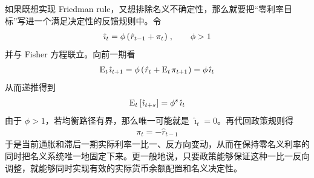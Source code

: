 \myskip
{}

如果既想实现 Friedman rule，又想排除名义不确定性，那么就要把“零利率目标”写进一个满足决定性的反馈规则中。令
\begin{align*}
    \hat\imath_t=\phi\bka{\hat r_{t-1}+\pi_t}\,,\qquad \phi>1
\end{align*}
并与 Fisher 方程联立。向前一期看
\begin{align*}
    \meant\,\hat\imath_{t+1}
    =\phi\bka{\hat r_t+\meant\,\pi\nt}
    =\phi\,\hat\imath_t
\end{align*}
从而递推得到
\begin{align*}
    \meant\bks{\hat\imath_{t+s}}=\phi^s\,\hat\imath_t
\end{align*}
由于 \(\phi>1\)，若均衡路径有界，那么唯一可能就是 \(\hat\imath_t=0\)。再代回政策规则得
\begin{align*}
    \pi_t=-\hat r_{t-1}
\end{align*}
于是当前通胀和滞后一期实际利率一比一、反方向变动，从而在保持零名义利率的同时把名义系统唯一地固定下来。更一般地说，只要政策能够保证这种一比一反向调整，就能够同时实现有效的实际货币余额配置和名义决定性。



\SymmetricGeometry
